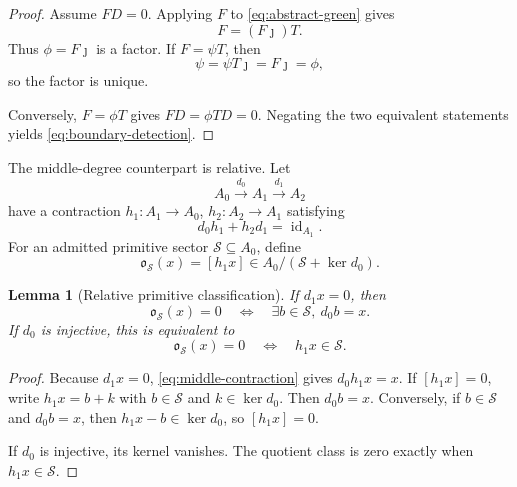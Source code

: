 \documentclass[11pt]{article}
\newtheorem{lemma}[theorem]{Lemma}
\theoremstyle{definition}
\theoremstyle{remark}
\newcommand{\cS}{\mathcal S}
\newcommand{\id}{\operatorname{id}}
\begin{document}
\begin{proof}
Assume \(FD=0\).  Applying \(F\) to \eqref{eq:abstract-green} gives
\[
                         F=(F\jmath)T.
\]
Thus \(\phi=F\jmath\) is a factor.  If \(F=\psi T\), then
\[
                         \psi=\psi T\jmath=F\jmath=\phi,
\]
so the factor is unique.

Conversely, \(F=\phi T\) gives \(FD=\phi TD=0\).  Negating the two
equivalent statements yields \eqref{eq:boundary-detection}.
\end{proof}

The middle-degree counterpart is relative.  Let
\[
 A_0\xrightarrow{d_0}A_1\xrightarrow{d_1}A_2
\tag{5.5}\label{eq:three-term}
\]
have a contraction \(h_1:A_1\to A_0\), \(h_2:A_2\to A_1\) satisfying
\[
                         d_0h_1+h_2d_1=\id_{A_1}.
\tag{5.6}\label{eq:middle-contraction}
\]
For an admitted primitive sector \(\cS\subseteq A_0\), define
\[
 \mathfrak o_{\cS}(x)
   =[h_1x]\in A_0/(\cS+\ker d_0).
\tag{5.7}\label{eq:relative-obstruction}
\]

\begin{lemma}[Relative primitive classification]
\label{lem:relative-classification}
If \(d_1x=0\), then
\[
 \mathfrak o_{\cS}(x)=0
 \quad\Longleftrightarrow\quad
 \exists b\in\cS,\ d_0b=x.
\tag{5.8}\label{eq:relative-existence}
\]
If \(d_0\) is injective, this is equivalent to
\[
                  \mathfrak o_{\cS}(x)=0
                  \quad\Longleftrightarrow\quad
                  h_1x\in\cS.
\tag{5.9}\label{eq:sector-preservation}
\]
\end{lemma}

\begin{proof}
Because \(d_1x=0\), \eqref{eq:middle-contraction} gives
\(d_0h_1x=x\).  If \([h_1x]=0\), write
\(h_1x=b+k\) with \(b\in\cS\) and \(k\in\ker d_0\).  Then
\(d_0b=x\).  Conversely, if \(b\in\cS\) and \(d_0b=x\), then
\(h_1x-b\in\ker d_0\), so \([h_1x]=0\).

If \(d_0\) is injective, its kernel vanishes.  The quotient class is zero
exactly when \(h_1x\in\cS\).
\end{proof}
\end{document}
